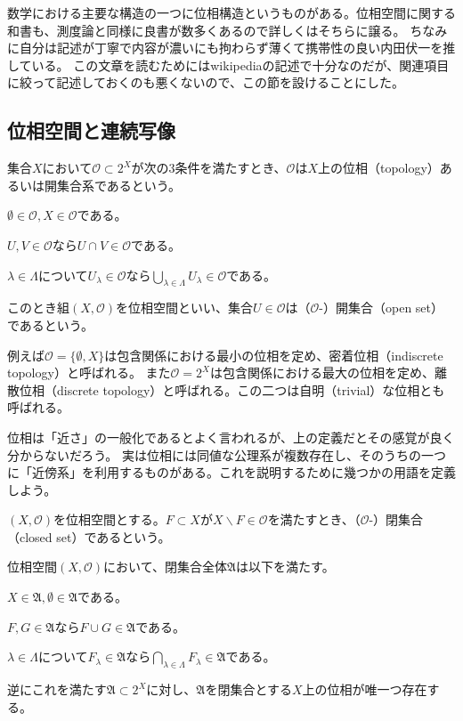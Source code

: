 \documentclass[../root.tex]{subfiles}
\begin{document}
数学における主要な構造の一つに位相構造というものがある。位相空間に関する和書も、測度論と同様に良書が数多くあるので詳しくはそちらに譲る。
ちなみに自分は記述が丁寧で内容が濃いにも拘わらず薄くて携帯性の良い内田伏一を推している。
この文章を読むためにはwikipediaの記述で十分なのだが、関連項目に絞って記述しておくのも悪くないので、この節を設けることにした。




\subsection{位相空間と連続写像}
\begin{Def}{}{}
集合$ X $において$ \mathcal{O}\subset 2^{X} $が次の3条件を満たすとき、$ \mathcal{O} $は$ X $上の位相（topology）あるいは開集合系であるという。
\begin{EnumCond}
\item $ \emptyset\in\mathcal{O}, X\in\mathcal{O} $である。
\item $ U, V\in\mathcal{O} $なら$ U\cap V\in\mathcal{O} $である。
\item $ \lambda\in\Lambda $について$ U_{\lambda}\in\mathcal{O} $なら$ \bigcup_{\lambda\in\Lambda}U_{\lambda}\in\mathcal{O} $である。
\end{EnumCond}

このとき組$ ( X, \mathcal{O} ) $を位相空間といい、集合$ U\in\mathcal{O} $は（$ \mathcal{O} $-）開集合（open set）であるという。
\end{Def}

例えば$ \mathcal{O}=\lbrace \emptyset, X \rbrace $は包含関係における最小の位相を定め、密着位相（indiscrete topology）と呼ばれる。
また$ \mathcal{O}=2^{X} $は包含関係における最大の位相を定め、離散位相（discrete topology）と呼ばれる。この二つは自明（trivial）な位相とも呼ばれる。

位相は「近さ」の一般化であるとよく言われるが、上の定義だとその感覚が良く分からないだろう。
実は位相には同値な公理系が複数存在し、そのうちの一つに「近傍系」を利用するものがある。これを説明するために幾つかの用語を定義しよう。

\begin{Def}{}{}
$ ( X, \mathcal{O} ) $を位相空間とする。$ F\subset X $が$ X\backslash F\in\mathcal{O} $を満たすとき、（$ \mathcal{O} $-）閉集合（closed set）であるという。
\end{Def}

\begin{Exc}{}{}
位相空間$ ( X, \mathcal{O} ) $において、閉集合全体$ \mathfrak{A} $は以下を満たす。
\begin{EnumCond}
\item $ X\in\mathfrak{A}, \emptyset\in\mathfrak{A} $である。
\item $ F, G\in\mathfrak{A} $なら$ F\cup G\in\mathfrak{A} $である。
\item $ \lambda\in\Lambda $について$ F_{\lambda}\in\mathfrak{A} $なら$ \bigcap_{\lambda\in\Lambda}F_{\lambda}\in\mathfrak{A} $である。
\end{EnumCond}

逆にこれを満たす$ \mathfrak{A}\subset 2^{X} $に対し、$ \mathfrak{A} $を閉集合とする$ X $上の位相が唯一つ存在する。
\end{Exc}
\end{document}
